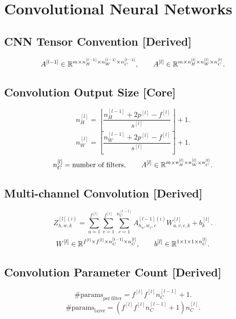 \section{Convolutional Neural Networks}

\subsection{CNN Tensor Convention \textbf{[Derived]}}

\[
A^{[l-1]}
\in
\mathbb{R}^{m \times n_H^{[l-1]} \times n_W^{[l-1]} \times n_C^{[l-1]}},
\qquad
A^{[l]}
\in
\mathbb{R}^{m \times n_H^{[l]} \times n_W^{[l]} \times n_C^{[l]}}.
\]

\subsection{Convolution Output Size \textbf{[Core]}}

\[
n_H^{[l]}
=
\left\lfloor
\frac{
n_H^{[l-1]} + 2p^{[l]} - f^{[l]}
}{
s^{[l]}
}
\right\rfloor
+1.
\]
\[
n_W^{[l]}
=
\left\lfloor
\frac{
n_W^{[l-1]} + 2p^{[l]} - f^{[l]}
}{
s^{[l]}
}
\right\rfloor
+1.
\]
\[
n_C^{[l]}=\text{number of filters},
\qquad
A^{[l]}
\in
\mathbb{R}^{m \times n_H^{[l]} \times n_W^{[l]} \times n_C^{[l]}}.
\]

\subsection{Multi-channel Convolution \textbf{[Derived]}}

\[
Z_{h,w,k}^{[l](i)}
=
\sum_{u=1}^{f^{[l]}}
\sum_{v=1}^{f^{[l]}}
\sum_{c=1}^{n_C^{[l-1]}}
A_{h_u,w_v,c}^{[l-1](i)}
W_{u,v,c,k}^{[l]}
+
b_k^{[l]}.
\]
\[
W^{[l]}
\in
\mathbb{R}^{f^{[l]} \times f^{[l]} \times n_C^{[l-1]} \times n_C^{[l]}},
\qquad
b^{[l]}
\in
\mathbb{R}^{1 \times 1 \times 1 \times n_C^{[l]}}.
\]

\subsection{Convolution Parameter Count \textbf{[Derived]}}

\[
\#\mathrm{params}_{\mathrm{per\ filter}}
=
f^{[l]} f^{[l]} n_C^{[l-1]} + 1.
\]
\[
\#\mathrm{params}_{\mathrm{layer}}
=
\left(
f^{[l]} f^{[l]} n_C^{[l-1]} + 1
\right)
n_C^{[l]}.
\]

